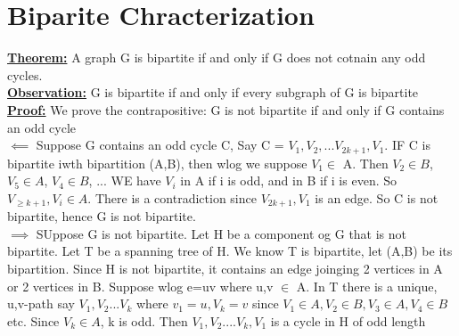 \documentclass[12pt]{article}
\newcommand{\myt}[1]{\textbf{\underline{#1}}}
\begin{document}
	\section*{Biparite Chracterization}
	\myt{Theorem:} A graph G is bipartite if and only if G does not cotnain any odd cycles.\\
	
	\myt{Observation:} G is bipartite if and only if every subgraph of G is bipartite\\
	
	\myt{Proof:} We prove the contrapositive: G is not bipartite if and only if G contains an odd cycle\\
	$\impliedby$ Suppose G contains an odd cycle C, Say C = $V_1,V_2,...V_{2k+1}, V_1$. IF C is bipartite iwth bipartition (A,B), then wlog we suppose $V_1 \in$ A. Then $V_2 \in B$, $V_5 \in A$, $V_4 \in B$, ... WE have $V_i$ in A if i is odd, and in B if i is even. So $V_{\geq k+1}, V_i \in A$. There is a contradiction since $V_{2k+1},V_1$ is an edge. So C is not bipartite, hence G is not bipartite.\\
	$\implies$ SUppose G is not bipartite. Let H be a component og G that is not bipartite. Let T be a spanning tree of H. We know T is bipartite, let (A,B) be its bipartition. Since H is not bipartite, it contains an edge joinging 2 vertices in A or 2 vertices in B. Suppose wlog e=uv where u,v $\in$ A. In T there is a unique, u,v-path say $V_1,V_2...V_k$ where $v_1 = u, V_k = v$ since $V_1 \in A, V_2 \in B, V_3 \in A, V_4 \in B$ etc. Since $V_k \in A$, k is odd. Then $V_1,V_2....V_k, V_1$ is a cycle in H of odd length\\
	
	
	
\end{document}
